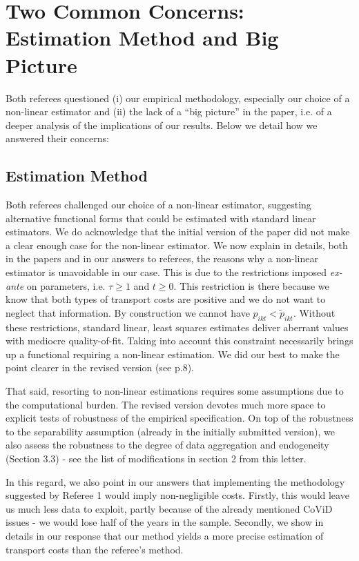 \documentclass[12pt]{article}
\begin{document}
\section{Two Common Concerns: Estimation Method and Big Picture}
Both referees questioned (i) our empirical methodology, especially our choice of a non-linear estimator and (ii) the lack of a ``big picture'' in the paper, i.e. of a deeper analysis of the implications of our results. Below we detail how we answered their concerns:\medskip

\subsection{Estimation Method}
Both referees challenged our choice of a non-linear estimator, suggesting alternative functional forms that could be estimated with standard linear estimators. We do acknowledge that the initial version of the paper did not make a clear enough case for the non-linear estimator. We now explain in details, both in the papers and in our answers to referees, the reasons why a non-linear estimator is unavoidable in our case. This is due to the restrictions imposed \textit{ex-ante} on parameters, i.e. $\tau \geq 1$ and $t\geq 0$. This restriction is there because we know that both types of transport costs are positive and we do not want to neglect that information. By construction we cannot have $p_{ikt} < \widetilde{p}_{ikt}$. Without these restrictions, standard linear, least squares estimates deliver aberrant values with mediocre quality-of-fit. Taking into account this constraint necessarily brings up a functional requiring a non-linear estimation. We did our best to make the point clearer in the revised version (see p.8). \medskip

That said, resorting to non-linear estimations requires some assumptions due to the computational burden. The revised version devotes much more space to explicit tests of robustness of the empirical specification. On top of the robustness to the separability assumption (already in the initially submitted version), we also assess the robustness to the degree of data aggregation and endogeneity (Section 3.3) - see the list of modifications in section 2 from this letter. \medskip

In this regard, we also point in our answers that implementing the methodology suggested by Referee 1 would imply non-negligible costs. Firstly, this would leave us much less data to exploit, partly  because of the already mentioned CoViD issues - we would lose half of the years in the sample. Secondly, we show in details in our response that our method yields a more precise estimation of transport costs than the referee's method. \medskip
\end{document}
